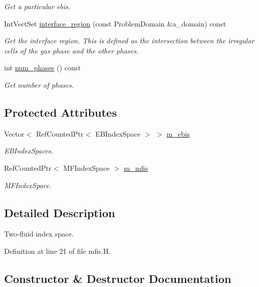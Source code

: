 \begin{DoxyCompactItemize}
\begin{DoxyCompactList}\small\item\em Get a particular ebis. \end{DoxyCompactList}\item 
Int\+Vect\+Set \hyperlink{classmfis_aa05265b0fe60b3eea478dfccd9facb5c}{interface\+\_\+region} (const Problem\+Domain \&a\+\_\+domain) const 
\begin{DoxyCompactList}\small\item\em Get the interface region. This is defined as the intersection between the irregular cells of the gas phase and the other phases. \end{DoxyCompactList}\item 
int \hyperlink{classmfis_af37ce52fdf3ca1e02946a14ed84f0519}{num\+\_\+phases} () const 
\begin{DoxyCompactList}\small\item\em Get number of phases. \end{DoxyCompactList}\end{DoxyCompactItemize}
\subsection*{Protected Attributes}
\begin{DoxyCompactItemize}
\item 
Vector$<$ Ref\+Counted\+Ptr$<$ E\+B\+Index\+Space $>$ $>$ \hyperlink{classmfis_af4f5f4f5369510dd59ee0e417b9049da}{m\+\_\+ebis}
\begin{DoxyCompactList}\small\item\em E\+B\+Index\+Spaces. \end{DoxyCompactList}\item 
Ref\+Counted\+Ptr$<$ M\+F\+Index\+Space $>$ \hyperlink{classmfis_a3a34f577f423a088458d19ec1c37737d}{m\+\_\+mfis}
\begin{DoxyCompactList}\small\item\em M\+F\+Index\+Space. \end{DoxyCompactList}\end{DoxyCompactItemize}


\subsection{Detailed Description}
Two-\/fluid index space. 

Definition at line 21 of file mfis.\+H.



\subsection{Constructor \& Destructor Documentation}
